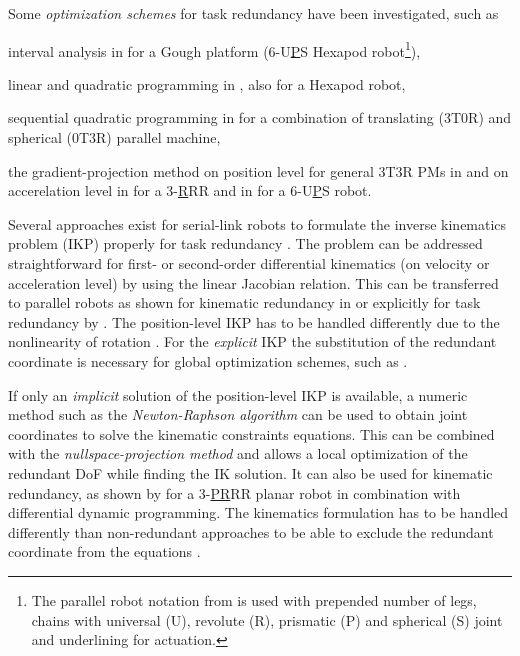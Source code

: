 \documentclass[
	graybox,
	vecphys] %
	{svmult}
\begin{document}
Some \emph{optimization schemes} for task redundancy have been investigated, such as
\begin{compactitem}
\item interval analysis in \cite{MerletPerDan2000} for a Gough platform (6-U\underline{P}S Hexapod robot\footnote{The parallel robot notation from \cite{Merlet2006} is used with prepended number of legs, chains with universal (U), revolute (R), prismatic (P) and spherical (S) joint and underlining for actuation.}), 
\item linear and quadratic programming in \cite{OenWan2007}, also for a Hexapod robot,
\item sequential quadratic programming in \cite{CorinaldiAngCal2016} for a combination of translating (3T0R) and spherical (0T3R) parallel machine,
\item the gradient-projection method on position level for general 3T3R PMs in \cite{SchapplerTapOrt2019} and on accerelation level in \cite{AgarwalNasBan2016} for a 3-\underline{R}RR and in \cite{SchapplerOrt2021} for a 6-U\underline{P}S robot.
\end{compactitem}

Several approaches exist for serial-link robots to formulate the inverse kinematics problem (IKP) properly for task redundancy \cite{ReiterMueGat2018}.
The problem can be addressed straightforward for first- or second-order differential kinematics (on velocity or acceleration level) by using the linear Jacobian relation.
This can be transferred to parallel robots as shown for kinematic redundancy in \cite{GosselinSch2018} or explicitly for task redundancy by \cite{AgarwalNasBan2016}.
The position-level IKP has to be handled differently due to the nonlinearity of rotation \cite{SchapplerTapOrt2019}.
For the \emph{explicit} IKP the substitution of the redundant coordinate is necessary for global optimization schemes, such as \cite{MerletPerDan2000}.

If only an \emph{implicit} solution of the position-level IKP is available, a numeric method such as the \emph{Newton-Raphson algorithm} can be used to obtain joint coordinates to solve the kinematic constraints equations.
This can be combined with the \emph{nullspace-projection method} and allows a local optimization of the redundant DoF while finding the IK solution.
It can also be used for kinematic redundancy, as shown by \cite{SantosSil2017} for a 3-\underline{PR}RR planar robot in combination with differential dynamic programming.
The kinematics formulation has to be handled differently than non-redundant approaches \cite{Merlet2006} to be able to exclude the redundant coordinate from the equations \cite{SchapplerTapOrt2019}.
\end{document}
